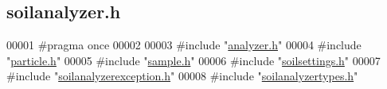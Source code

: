 \hypertarget{soilanalyzer_8h_source}{}\subsection{soilanalyzer.\+h}
\label{soilanalyzer_8h_source}

\begin{DoxyCode}
00001 \textcolor{preprocessor}{#pragma once}
00002 
00003 \textcolor{preprocessor}{#include "\hyperlink{analyzer_8h}{analyzer.h}"}
00004 \textcolor{preprocessor}{#include "\hyperlink{particle_8h}{particle.h}"}
00005 \textcolor{preprocessor}{#include "\hyperlink{sample_8h}{sample.h}"}
00006 \textcolor{preprocessor}{#include "\hyperlink{soilsettings_8h}{soilsettings.h}"}
00007 \textcolor{preprocessor}{#include "\hyperlink{soilanalyzerexception_8h}{soilanalyzerexception.h}"}
00008 \textcolor{preprocessor}{#include "\hyperlink{soilanalyzertypes_8h}{soilanalyzertypes.h}"}
\end{DoxyCode}
